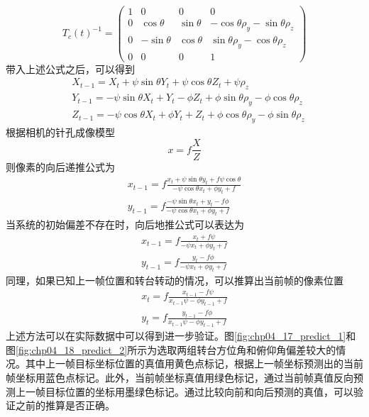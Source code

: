 \begin{equation}
T_c(t)^{-1} =\begin{pmatrix} 1 & 0 & 0 & 0 \\ 0 & \cos \theta & \sin \theta & -\cos \theta \rho_y -\sin \theta \rho_z \\0 & -\sin \theta & \cos \theta & \sin\theta \rho_y-\cos \theta \rho_z \\ 0 & 0 & 0 & 1 \end{pmatrix}
\end{equation}
带入上述公式之后，可以得到
\begin{align}
&X_{t-1} = X_t + \psi \sin \theta Y_t + \psi \cos \theta Z_t + \psi \rho_z \\
&Y_{t-1} = -\psi \sin \theta X_t +  Y_ t - \phi Z_t + \phi \sin \theta \rho_y - \phi \cos \theta \rho_z \\
&Z_{t-1}  = -\psi \cos \theta X_t + \phi  Y_ t + Z_t + \phi \cos \theta \rho_y - \phi \sin \theta \rho_z
\end{align}
根据相机的针孔成像模型
\begin{equation}
x = f \frac{X}{Z}
\end{equation}
则像素的向后递推公式为
\begin{align}
x_{t-1} = f\frac{x_t+\psi \sin \theta y_t + f\psi \cos \theta}{- \psi \cos \theta x_t + \phi y_t + f} \\
y_{t-1} = f\frac{-\psi \sin \theta x_t +y_t -f\phi}{- \psi \cos \theta x_t + \phi y_t + f}
\end{align}
当系统的初始偏差不存在时，向后地推公式可以表达为
\begin{align}
\label{eq:curr_predict_prev]}
x_{t-1} = f\frac{x_t + f\psi }{- \psi  x_t  + \phi y_t + f} \\
y_{t-1} = f\frac{y_t -f\phi}{- \psi  x_t + \phi y_t + f}
\end{align}
同理，如果已知上一帧位置和转台转动的情况，可以推算出当前帧的像素位置
\begin{align}
\label{eq:prev_predict_curr}
x_{t} = f\frac{x_{t-1} - f\psi }{x_{t-1}  \psi  - \phi y_{t-1} + f} \\
y_{t} = f\frac{y_{t-1} -f\phi}{  x_{t-1} \psi - \phi y_{t-1} + f}
\end{align}
上述方法可以在实际数据中可以得到进一步验证。图\ref{fig:chp04_17_predict_1}和图\ref{fig:chp04_18_predict_2}所示为选取两组转台方位角和俯仰角偏差较大的情况。其中上一帧目标坐标位置的真值用黄色点标记，根据上一帧坐标预测出的当前帧坐标用蓝色点标记。此外，当前帧坐标真值用绿色标记，通过当前帧真值反向预测上一帧目标位置的坐标用墨绿色标记。通过比较向前和向后预测的真值，可以验证之前的推算是否正确。


